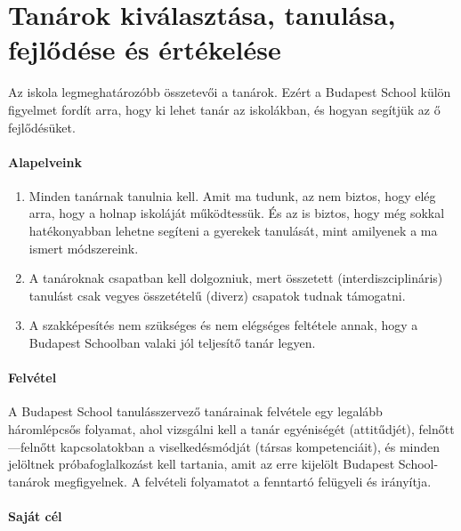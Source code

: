 \hypertarget{tanarok-kivalasztasa-tanulasa-fejlodese-es-ertekelese}{%
\section{Tanárok kiválasztása, tanulása, fejlődése\break
és értékelése}\label{tanarok-kivalasztasa-tanulasa-fejlodese-es-ertekelese}}

Az iskola legmeghatározóbb összetevői a tanárok. Ezért a Budapest School
külön figyelmet fordít arra, hogy ki lehet tanár az iskolákban, és
hogyan segítjük az ő fejlődésüket.

\paragraph{Alapelveink}
        
\begin{enumerate}
\def\labelenumi{\arabic{enumi}.}
\tightlist
\item
  Minden tanárnak tanulnia kell. Amit ma tudunk, az nem biztos, hogy
  elég arra, hogy a holnap iskoláját működtessük. És az is biztos, hogy
  még sokkal hatékonyabban lehetne segíteni a gyerekek tanulását, mint
  amilyenek a ma ismert módszereink.
\item
  A tanároknak csapatban kell dolgozniuk, mert összetett
  (interdiszciplináris) tanulást csak vegyes összetételű (diverz)
  csapatok tudnak támogatni.
\item
  A szakképesítés nem szükséges és nem elégséges feltétele annak, hogy a
  Budapest Schoolban valaki jól teljesítő tanár legyen.
\end{enumerate}

\hypertarget{felvetel}{%
\paragraph{Felvétel}\label{felvetel}}

A Budapest School tanulásszervező tanárainak felvétele egy legalább
háromlépcsős folyamat, ahol vizsgálni kell a tanár egyéniségét
(attitűdjét), felnőtt---felnőtt kapcsolatokban a viselkedésmódját (társas
kompetenciáit), és minden jelöltnek próbafoglalkozást kell tartania,
amit az erre kijelölt Budapest School-tanárok megfigyelnek. A felvételi
folyamatot a fenntartó felügyeli és irányítja.

\hypertarget{sajat-cel}{%
\paragraph{Saját cél}\label{sajat-cel}}


